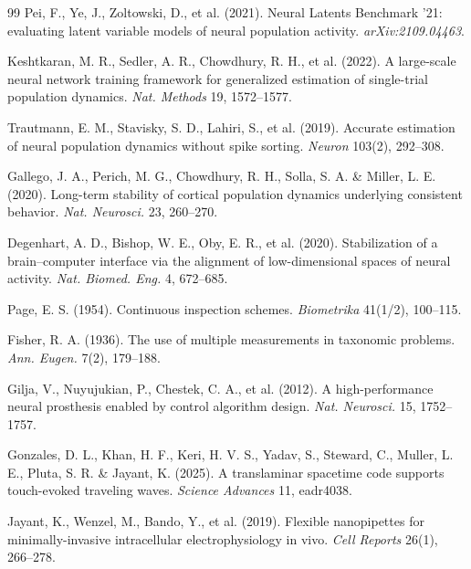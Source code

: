 \documentclass[11pt]{article}
\begin{document}
\begin{thebibliography}{99}
 Pei, F., Ye, J., Zoltowski, D., et al. (2021). Neural Latents
Benchmark '21: evaluating latent variable models of neural population activity.
\emph{arXiv:2109.04463}.

 Keshtkaran, M. R., Sedler, A. R., Chowdhury, R. H., et
al. (2022). A large-scale neural network training framework for generalized
estimation of single-trial population dynamics. \emph{Nat. Methods} 19,
1572--1577.

 Trautmann, E. M., Stavisky, S. D., Lahiri, S., et al.
(2019). Accurate estimation of neural population dynamics without spike sorting.
\emph{Neuron} 103(2), 292--308.

 Gallego, J. A., Perich, M. G., Chowdhury, R. H., Solla, S.
A. \& Miller, L. E. (2020). Long-term stability of cortical population dynamics
underlying consistent behavior. \emph{Nat. Neurosci.} 23, 260--270.

 Degenhart, A. D., Bishop, W. E., Oby, E. R., et al.
(2020). Stabilization of a brain--computer interface via the alignment of
low-dimensional spaces of neural activity. \emph{Nat. Biomed. Eng.} 4, 672--685.

 Page, E. S. (1954). Continuous inspection schemes.
\emph{Biometrika} 41(1/2), 100--115.

 Fisher, R. A. (1936). The use of multiple measurements in
taxonomic problems. \emph{Ann. Eugen.} 7(2), 179--188.

 Gilja, V., Nuyujukian, P., Chestek, C. A., et al. (2012). A
high-performance neural prosthesis enabled by control algorithm design.
\emph{Nat. Neurosci.} 15, 1752--1757.

 Gonzales, D. L., Khan, H. F., Keri, H. V. S., Yadav, S.,
Steward, C., Muller, L. E., Pluta, S. R. \& Jayant, K. (2025). A translaminar
spacetime code supports touch-evoked traveling waves. \emph{Science Advances} 11,
eadr4038.

 Jayant, K., Wenzel, M., Bando, Y., et al. (2019). Flexible
nanopipettes for minimally-invasive intracellular electrophysiology in vivo.
\emph{Cell Reports} 26(1), 266--278.

\end{thebibliography}
\end{document}
